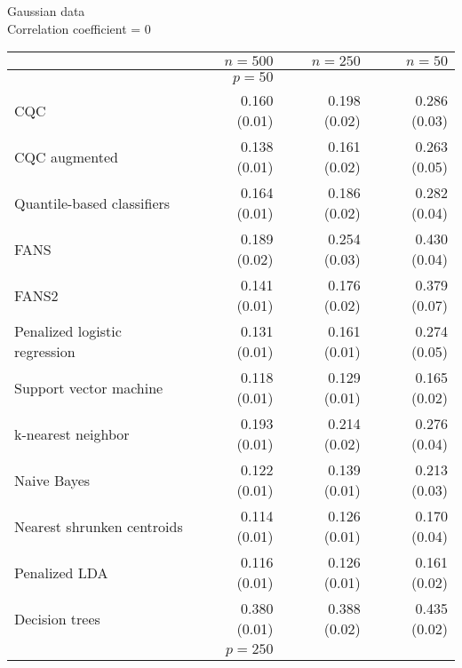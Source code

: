 

\begin{table}[p]
  \centering
  Gaussian data \\
  Correlation coefficient = 0 \\[2ex]
  \begin{adjustbox}{max size={\textwidth}{10cm}}
    \begin{tabular}{l@{\extracolsep{15mm}}rrr}
      
      \hline
      & $n=500$ & $n=250$ & $n=50$ \\ 
      \hline
      & $p = 50$ \\
      \hline

      CQC & 0.160 (0.01) & 0.198 (0.02) & 0.286 (0.03) \\ 
      CQC augmented & 0.138 (0.01) & 0.161 (0.02) & 0.263 (0.05) \\
      Quantile-based classifiers & 0.164 (0.01) & 0.186 (0.02) & 0.282 (0.04) \\
      FANS  & 0.189 (0.02) & 0.254 (0.03) & 0.430 (0.04) \\
      FANS2 & 0.141 (0.01) & 0.176 (0.02) & 0.379 (0.07) \\
      Penalized logistic regression & 0.131 (0.01) & 0.161 (0.01) & 0.274 (0.05) \\ 
      Support vector machine & 0.118 (0.01) & 0.129 (0.01) & 0.165 (0.02) \\ 
      k-nearest neighbor & 0.193 (0.01) & 0.214 (0.02) & 0.276 (0.04) \\ 
      Naive Bayes & 0.122 (0.01) & 0.139 (0.01) & 0.213 (0.03) \\ 
      Nearest shrunken centroids & 0.114 (0.01) & 0.126 (0.01) & 0.170 (0.04) \\ 
      Penalized LDA & 0.116 (0.01) & 0.126 (0.01) & 0.161 (0.02) \\ 
      Decision trees & 0.380 (0.01) & 0.388 (0.02) & 0.435 (0.02) \\ [2ex]

      \hline
      & $p = 250$ \\
      \hline


\end{tabular}
\end{adjustbox}
\end{table}
